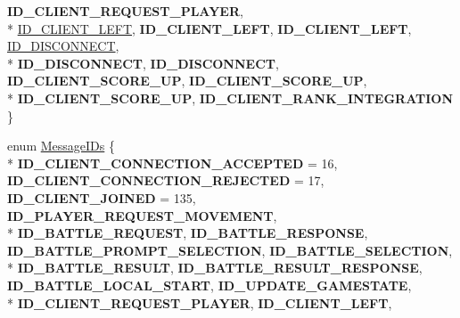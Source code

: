 \begin{DoxyCompactItemize}
{\bfseries I\-D\-\_\-\-C\-L\-I\-E\-N\-T\-\_\-\-R\-E\-Q\-U\-E\-S\-T\-\_\-\-P\-L\-A\-Y\-E\-R}, 
\\*
\hyperlink{namespace_champ_net_plugin_a2ade5cfa7cf6c25ab7236c6b54a57821a170a6a655b34086567c4039a8e9ba81d}{I\-D\-\_\-\-C\-L\-I\-E\-N\-T\-\_\-\-L\-E\-F\-T}, 
{\bfseries I\-D\-\_\-\-C\-L\-I\-E\-N\-T\-\_\-\-L\-E\-F\-T}, 
{\bfseries I\-D\-\_\-\-C\-L\-I\-E\-N\-T\-\_\-\-L\-E\-F\-T}, 
\hyperlink{namespace_champ_net_plugin_a2ade5cfa7cf6c25ab7236c6b54a57821ab64ca706dd3c8029ea9dc9a239237e15}{I\-D\-\_\-\-D\-I\-S\-C\-O\-N\-N\-E\-C\-T}, 
\\*
{\bfseries I\-D\-\_\-\-D\-I\-S\-C\-O\-N\-N\-E\-C\-T}, 
{\bfseries I\-D\-\_\-\-D\-I\-S\-C\-O\-N\-N\-E\-C\-T}, 
{\bfseries I\-D\-\_\-\-C\-L\-I\-E\-N\-T\-\_\-\-S\-C\-O\-R\-E\-\_\-\-U\-P}, 
{\bfseries I\-D\-\_\-\-C\-L\-I\-E\-N\-T\-\_\-\-S\-C\-O\-R\-E\-\_\-\-U\-P}, 
\\*
{\bfseries I\-D\-\_\-\-C\-L\-I\-E\-N\-T\-\_\-\-S\-C\-O\-R\-E\-\_\-\-U\-P}, 
{\bfseries I\-D\-\_\-\-C\-L\-I\-E\-N\-T\-\_\-\-R\-A\-N\-K\-\_\-\-I\-N\-T\-E\-G\-R\-A\-T\-I\-O\-N}
 \}
\item 
enum \hyperlink{namespace_champ_net_plugin_a2ade5cfa7cf6c25ab7236c6b54a57821}{Message\-I\-Ds} \{ \\*
{\bfseries I\-D\-\_\-\-C\-L\-I\-E\-N\-T\-\_\-\-C\-O\-N\-N\-E\-C\-T\-I\-O\-N\-\_\-\-A\-C\-C\-E\-P\-T\-E\-D} = 16, 
{\bfseries I\-D\-\_\-\-C\-L\-I\-E\-N\-T\-\_\-\-C\-O\-N\-N\-E\-C\-T\-I\-O\-N\-\_\-\-R\-E\-J\-E\-C\-T\-E\-D} = 17, 
{\bfseries I\-D\-\_\-\-C\-L\-I\-E\-N\-T\-\_\-\-J\-O\-I\-N\-E\-D} = 135, 
{\bfseries I\-D\-\_\-\-P\-L\-A\-Y\-E\-R\-\_\-\-R\-E\-Q\-U\-E\-S\-T\-\_\-\-M\-O\-V\-E\-M\-E\-N\-T}, 
\\*
{\bfseries I\-D\-\_\-\-B\-A\-T\-T\-L\-E\-\_\-\-R\-E\-Q\-U\-E\-S\-T}, 
{\bfseries I\-D\-\_\-\-B\-A\-T\-T\-L\-E\-\_\-\-R\-E\-S\-P\-O\-N\-S\-E}, 
{\bfseries I\-D\-\_\-\-B\-A\-T\-T\-L\-E\-\_\-\-P\-R\-O\-M\-P\-T\-\_\-\-S\-E\-L\-E\-C\-T\-I\-O\-N}, 
{\bfseries I\-D\-\_\-\-B\-A\-T\-T\-L\-E\-\_\-\-S\-E\-L\-E\-C\-T\-I\-O\-N}, 
\\*
{\bfseries I\-D\-\_\-\-B\-A\-T\-T\-L\-E\-\_\-\-R\-E\-S\-U\-L\-T}, 
{\bfseries I\-D\-\_\-\-B\-A\-T\-T\-L\-E\-\_\-\-R\-E\-S\-U\-L\-T\-\_\-\-R\-E\-S\-P\-O\-N\-S\-E}, 
{\bfseries I\-D\-\_\-\-B\-A\-T\-T\-L\-E\-\_\-\-L\-O\-C\-A\-L\-\_\-\-S\-T\-A\-R\-T}, 
{\bfseries I\-D\-\_\-\-U\-P\-D\-A\-T\-E\-\_\-\-G\-A\-M\-E\-S\-T\-A\-T\-E}, 
\\*
{\bfseries I\-D\-\_\-\-C\-L\-I\-E\-N\-T\-\_\-\-R\-E\-Q\-U\-E\-S\-T\-\_\-\-P\-L\-A\-Y\-E\-R}, 
{\bfseries I\-D\-\_\-\-C\-L\-I\-E\-N\-T\-\_\-\-L\-E\-F\-T}, 

\end{DoxyCompactItemize}
